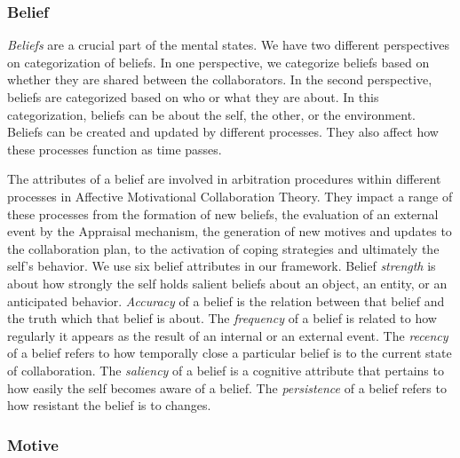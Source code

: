 \documentclass{article}
\begin{document}
\subsubsection{Belief}
\label{sec:belief}

\textit{Beliefs} are a crucial part of the mental states. We have two different
perspectives on categorization of beliefs. In one perspective, we categorize
beliefs based on whether they are shared between the collaborators. In the
second perspective, beliefs are categorized based on who or what they are about.
In this categorization, beliefs can be about the self, the other, or the
environment. Beliefs can be created and updated by different processes. They
also affect how these processes function as time passes.

The attributes of a belief are involved in arbitration procedures within
different processes in Affective Motivational Collaboration Theory. They impact
a range of these processes from the formation of new beliefs, the evaluation of
an external event by the Appraisal mechanism, the generation of new motives and
updates to the collaboration plan, to the activation of coping strategies and
ultimately the self's behavior. We use six belief attributes in our framework.
Belief \textit{strength} is about how strongly the self holds salient beliefs
about an object, an entity, or an anticipated behavior. \textit{Accuracy} of a
belief is the relation between that belief and the truth which that belief is
about. The \textit{frequency} of a belief is related to how regularly it appears
as the result of an internal or an external event. The \textit{recency} of a
belief refers to how temporally close a particular belief is to the current
state of collaboration. The \textit{saliency} of a belief is a cognitive
attribute that pertains to how easily the self becomes aware of a belief. The
\textit{persistence} of a belief refers to how resistant the belief is to
changes.

\subsubsection{Motive}
\label{sec:motive}
\end{document}
